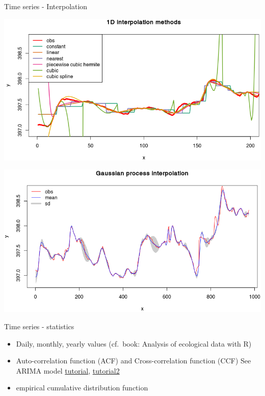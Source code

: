 \documentclass[8pt,ignorenonframetext,]{beamer}
\providecommand{\tightlist}{%
  \setlength{\itemsep}{0pt}\setlength{\parskip}{0pt}}
\begin{document}
\begin{frame}{Time series - Interpolation}

\includegraphics[height=0.35000\textwidth]{imgPres/TS_1D_interp.png}

\includegraphics[height=0.35000\textwidth]{imgPres/TS_GP_interp.png}

\end{frame}

\begin{frame}{Time series - statistics}

\begin{itemize}
\tightlist
\item
  Daily, monthly, yearly values (cf.~book: Analysis of ecological data
  with R)
\item
  Auto-correlation function (ACF) and Cross-correlation function (CCF)
  See ARIMA model
  \href{https://www.analyticsvidhya.com/blog/2015/12/complete-tutorial-time-series-modeling/}{tutorial},
  \href{http://a-little-book-of-r-for-time-series.readthedocs.io/en/latest/src/timeseries.html}{tutorial2}
\item
  empirical cumulative distribution function
\end{itemize}

\end{frame}
\end{document}
